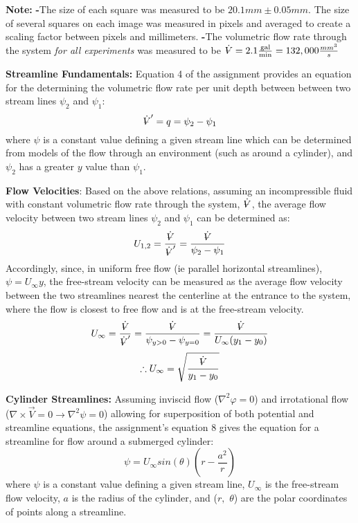 \documentclass[12pt]{article}
\makeatletter
\DeclareRobustCommand{\volume}{\text{\volumedash}V}
\newcommand{\volumedash}{%
	\makebox[0pt][l]{%
		\ooalign{\hfil\hphantom{$\m@th V$}\hfil\cr\kern0.08em--\hfil\cr}%
	}%
}
\makeatother
\begin{document}
	\hfill\break\break
	\textbf{Note:} \hfill\break
	\textbf{-}The size of each square was measured to be $20.1mm\pm0.05mm$. The size of several squares on each image was measured in pixels and averaged to create a scaling factor between pixels and millimeters.
	\hfill\break
	\textbf{-}The volumetric flow rate through the system \textit{for all experiments} was measured to be $\dot{\volume}=2.1 \frac{\textrm{gal}}{\textrm{min}}=132,000 \frac{mm^{3}}{s}$
	
	\hfill\break\break
	\textbf{Streamline Fundamentals:}
	Equation 4 of the assignment provides an equation for the determining the volumetric flow rate per unit depth between between two stream lines $\psi_{2}$ and $\psi_{1}$:
	$$\dot{\volume}'=q=\psi_{2}-\psi_{1}$$
	where $\psi$ is a constant value defining a given stream line which can be determined from models of the flow through an environment (such as around a cylinder), and $\psi_{2}$ has a greater $y$ value than $\psi_{1}$.
	
	\hfill\break\break
	\textbf{Flow Velocities}:
	Based on the above relations, assuming an incompressible fluid with constant volumetric flow rate through the system, $\dot{\volume}$, the average flow velocity between two stream lines $\psi_{2}$ and $\psi_{1}$ can be determined as:
	$$U_{1,2}= \frac{\dot{\volume}}{\dot{\volume}'}=\frac{\dot{\volume}}{\psi_{2}-\psi_{1}}$$
	\hfill\break\break
	Accordingly, since, in uniform free flow (ie parallel horizontal streamlines), $\psi=U_{\infty}y$, the free-stream velocity can be measured as the average flow velocity between the two streamlines nearest the centerline at the entrance to the system, where the flow is closest to free flow and is at the free-stream velocity.
	$$U_{\infty}= \frac{\dot{\volume}}{\dot{\volume}'}=\frac{\dot{\volume}}{\psi_{y>0}-\psi_{y=0}}=\frac{\dot{\volume}}{U_{\infty}(y_{1}-y_{0})}$$
	$$\therefore U_{\infty}=\sqrt{\frac{\dot{\volume}}{y_{1}-y_{0}}}$$
	
	\hfill\break\break
	\textbf{Cylinder Streamlines:}
	Assuming inviscid flow ($\nabla^{2}\varphi=0$) and irrotational flow ($\nabla\times\vec{V}=0 \rightarrow \nabla^{2}\psi=0$) allowing for superposition of both potential and streamline equations, the assignment's equation 8 gives the equation for a streamline for flow around a submerged cylinder:
	$$ \psi = U_{\infty}sin(\theta)\left(r-\frac{a^{2}}{r}\right)$$
	where $\psi$ is a constant value defining a given stream line, $U_{\infty}$ is the free-stream flow velocity, $a$ is the radius of the cylinder, and ($r,$ $\theta$) are the polar coordinates of points along a streamline.
	
\end{document}
